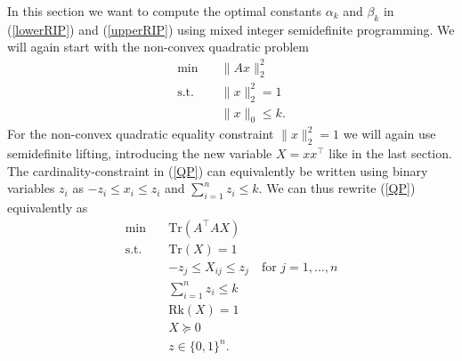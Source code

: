 \documentclass[journal]{IEEEtran}
\newcommand{\Norm}[2]{\lVert{#1}\rVert_{#2}}
\newcommand{\T}{^{\top}}
\newcommand{\Tr}{\text{Tr}}
\newcommand{\Rk}{\text{Rk}}
\begin{document}
In this section we want to compute the optimal constants $\alpha_k$ and $\beta_k$ in (\ref{lowerRIP}) and (\ref{upperRIP}) using mixed integer semidefinite programming. We will again start with the non-convex quadratic problem
\begin{align}\label{QP2}
 \min \quad & \Norm{Ax}{2}^2 \nonumber \\
 \text{s.t.} \quad & \Norm{x}{2}^2 = 1 \tag{QP} \\
 & \Norm{x}{0} \leq k. \nonumber
\end{align}
For the non-convex quadratic equality constraint $\Norm{x}{2}^2 = 1$ we will
again use semidefinite lifting, introducing the new variable $X=xx\T$ like in the last section. 
The cardinality-constraint in (\ref{QP}) can equivalently be written using binary variables $z_i$ as $-z_i \leq x_i \leq z_i$ and $\sum_{i=1}^n z_i \leq k$. We can thus rewrite (\ref{QP}) equivalently as
% 
% 
\begin{align}\label{Rk1MISDP}
 \min \quad & \Tr(A\T A X) \nonumber \\
 \text{s.t.} \quad & \Tr(X) = 1 \nonumber \\
 & -z_j \leq X_{ij} \leq z_j \quad \text{for } j = 1, ..., n \nonumber \\
 & \sum_{i=1}^n z_i \leq k \tag{M1} \\
 & \Rk(X) = 1 \nonumber \\
 & X \succeq 0  \nonumber \\
 & z \in \{0,1\}^n. \nonumber
\end{align}
\end{document}
